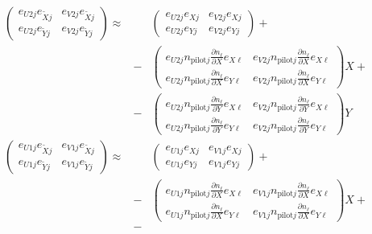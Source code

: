 \documentclass[12pt,a4paper,twoside,openright,BCOR10mm,headsepline,titlepage,abstracton,chapterprefix,final]{scrreprt}
\newcommand\pilot{\textrm{pilot}}
\begin{document}
\begin{eqnarray}
 \begin{pmatrix}
  e_{U2j} e_{\tilde{X}j}  &  e_{V2j} e_{\tilde{X}j}
   \\
  e_{U2j} e_{\tilde{Y}j}  &  e_{V2j} e_{\tilde{Y}j}
 \end{pmatrix}
 \approx&&
 \begin{pmatrix}
  e_{U2j} e_{Xj} &  e_{V2j} e_{Xj}
   \\
  e_{U2j} e_{Yj} &  e_{V2j} e_{Yj}
 \end{pmatrix} + 
\nonumber\\&-&
 \begin{pmatrix}
  e_{U2j} n_{\pilot j} \frac{\partial n_\ell}{\partial X} e_{X\ell} &  e_{V2j} n_{\pilot j} \frac{\partial n_\ell}{\partial X} e_{X\ell}
   \\
  e_{U2j} n_{\pilot j} \frac{\partial n_\ell}{\partial X} e_{Y\ell} &  e_{V2j} n_{\pilot j} \frac{\partial n_\ell}{\partial X} e_{Y\ell}
 \end{pmatrix} X + 
\nonumber\\&-&
 \begin{pmatrix}
  e_{U2j} n_{\pilot j} \frac{\partial n_\ell}{\partial Y} e_{X\ell} &  e_{V2j} n_{\pilot j} \frac{\partial n_\ell}{\partial Y} e_{X\ell}
   \\
  e_{U2j} n_{\pilot j} \frac{\partial n_\ell}{\partial Y} e_{Y\ell} &  e_{V2j} n_{\pilot j} \frac{\partial n_\ell}{\partial Y} e_{Y\ell}
 \end{pmatrix} Y 
\\
 \begin{pmatrix}
  e_{U1j} e_{\tilde{X}j}  &  e_{V1j} e_{\tilde{X}j}
 \\
  e_{U1j} e_{\tilde{Y}j}  &  e_{V1j} e_{\tilde{Y}j}
 \end{pmatrix}
 \approx&&
 \begin{pmatrix}
  e_{U1j} e_{Xj} &  e_{V1j} e_{Xj}
   \\
  e_{U1j} e_{Yj} &  e_{V1j} e_{Yj}
 \end{pmatrix} + 
\nonumber\\&-&
 \begin{pmatrix}
  e_{U1j} n_{\pilot j} \frac{\partial n_\ell}{\partial X} e_{X\ell} &  e_{V1j} n_{\pilot j} \frac{\partial n_\ell}{\partial X} e_{X\ell}
   \\
  e_{U1j} n_{\pilot j} \frac{\partial n_\ell}{\partial X} e_{Y\ell} &  e_{V1j} n_{\pilot j} \frac{\partial n_\ell}{\partial X} e_{Y\ell}
 \end{pmatrix} X + 
\nonumber\\&-&

\end{eqnarray}
\end{document}
